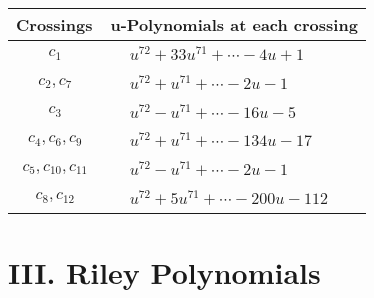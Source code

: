 \documentclass[1p]{elsarticle_modified}
\theoremstyle{definition}
\begin{document}
\begin{tabular}{m{50pt}|m{274pt}}
Crossings & \hspace{64pt}u-Polynomials at each crossing \\
\hline $$\begin{aligned}c_{1}\end{aligned}$$&$\begin{aligned}
&u^{72}+33 u^{71}+\cdots-4 u+1
\end{aligned}$\\
\hline $$\begin{aligned}c_{2},c_{7}\end{aligned}$$&$\begin{aligned}
&u^{72}+u^{71}+\cdots-2 u-1
\end{aligned}$\\
\hline $$\begin{aligned}c_{3}\end{aligned}$$&$\begin{aligned}
&u^{72}- u^{71}+\cdots-16 u-5
\end{aligned}$\\
\hline $$\begin{aligned}c_{4},c_{6},c_{9}\end{aligned}$$&$\begin{aligned}
&u^{72}+u^{71}+\cdots-134 u-17
\end{aligned}$\\
\hline $$\begin{aligned}c_{5},c_{10},c_{11}\end{aligned}$$&$\begin{aligned}
&u^{72}- u^{71}+\cdots-2 u-1
\end{aligned}$\\
\hline $$\begin{aligned}c_{8},c_{12}\end{aligned}$$&$\begin{aligned}
&u^{72}+5 u^{71}+\cdots-200 u-112
\end{aligned}$\\
\hline
\end{tabular}\newpage\renewcommand{\arraystretch}{1}
\centering \section*{ III. Riley Polynomials}
\end{document}
